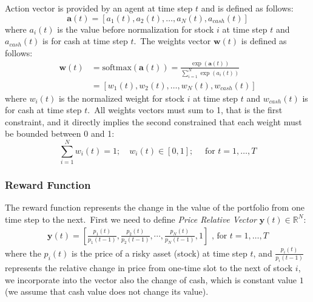 \documentclass[../xlapes02]{subfiles}
\begin{document}
    Action vector is provided by an agent at time step $t$ and is defined as follows:
    \begin{equation}
        \label{eq:action-vector}
        \bm{a}(t) = [a_1(t), a_2(t), \ldots, a_N(t), a_{cash}(t)]
    \end{equation}
    where $a_i(t)$ is the value before normalization for stock $i$ at time step $t$ and $a_{cash}(t)$ is for cash at time step $t$.\ The weights vector $\bm{w}(t)$ is defined as follows:
    \begin{equation}
        \label{eq:weights-vector}
        \begin{split}
            \bm{w}(t) &= \text{softmax}(\bm{a}(t)) = \frac{\exp(\bm{a}(t))}{\sum_{i=1}^{N}\exp(a_i(t))} \\
            &= [w_1(t), w_2(t), \ldots, w_N(t), w_{cash}(t)]
        \end{split}
    \end{equation}
    where $w_i(t)$ is the normalized weight for stock $i$ at time step $t$ and $w_{cash}(t)$ is for cash at time step $t$.\ All weights vectors must sum to 1, that is the first constraint, and it directly implies the second constrained that each weight must be bounded between 0 and 1:
    \begin{equation}
        \label{eq:equation-constraint}
        \sum_{i=1}^{N}w_i(t)=1;\quad w_i(t)\in[0,1];\quad\text{ for }t=1,\ldots,T
    \end{equation}

    \subsubsection{Reward Function}\label{subsubsec:reward-function-portfolio}
    The reward function represents the change in the value of the portfolio from one time step to the next.\ First we need to define \emph{Price Relative Vector} $\bm{y}(t) \in \mathbb{R}^N$:
    \begin{equation}
        \label{eq:price-relative-vector}
        \begin{split}
            \bm{y}(t)=\left[\frac{p_1(t)}{p_1(t-1)}, \frac{p_2(t)}{p_2(t-1)}, \cdots, \frac{p_N(t)}{p_N(t-1)}, 1\right]\text{ , for }t=1,\ldots,T
        \end{split}
    \end{equation}
    where the $p_i(t)$ is the price of a risky asset (stock) at time step $t$, and $\frac{p_i(t)}{p_i(t-1)}$ represents the relative change in price from one-time slot to the next of stock $i$, we incorporate into the vector also the change of cash, which is constant value $1$ (we assume that cash value does not change its value).
\end{document}
